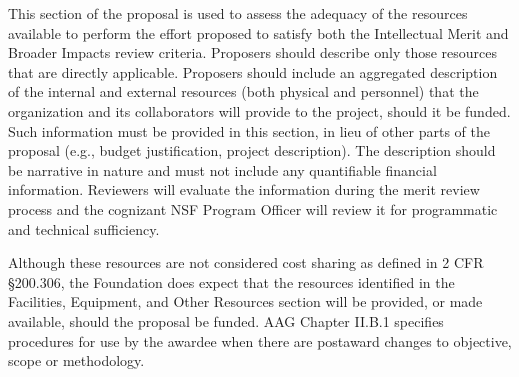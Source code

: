 This section of the proposal is used to assess the adequacy of the
resources available to perform the effort proposed to satisfy both the
Intellectual Merit and Broader Impacts review criteria. Proposers
should describe only those resources that are directly
applicable. Proposers should include an aggregated description of the
internal and external resources (both physical and personnel) that the
organization and its collaborators will provide to the project, should
it be funded. Such information must be provided in this section, in
lieu of other parts of the proposal (e.g., budget justification,
project description). The description should be narrative in nature
and must not include any quantifiable financial information. Reviewers
will evaluate the information during the merit review process and the
cognizant NSF Program Officer will review it for programmatic and
technical sufficiency.

Although these resources are not considered cost sharing as defined in
2 CFR \S 200.306, the Foundation does expect that the resources
identified in the Facilities, Equipment, and Other Resources section
will be provided, or made available, should the proposal be
funded. AAG Chapter II.B.1 specifies procedures for use by the awardee
when there are postaward changes to objective, scope or methodology.

